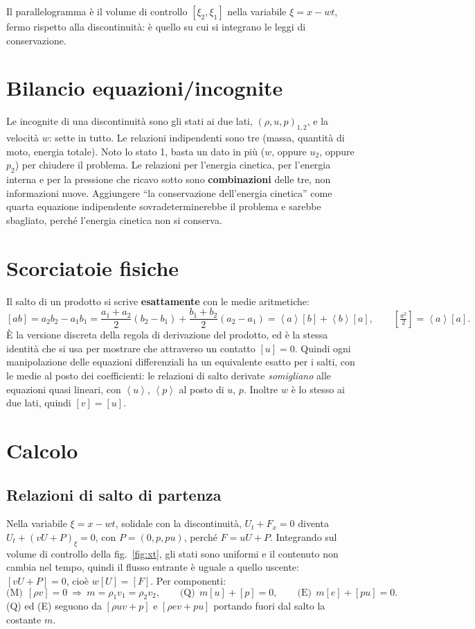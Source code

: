 \documentclass[11pt,a4paper]{article}
\newcommand{\jp}[1]{\left[#1\right]}            %
\newcommand{\av}[1]{\left\langle #1\right\rangle} %
\begin{document}
Il parallelogramma è il volume di controllo $[\xi_2,\xi_1]$ nella variabile $\xi=x-wt$, fermo rispetto alla
discontinuità: è quello su cui si integrano le leggi di conservazione.

\section{Bilancio equazioni/incognite}
Le incognite di una discontinuità sono gli stati ai due lati, $(\rho,u,p)_{1,2}$, e la velocità $w$: sette in
tutto. Le relazioni indipendenti sono tre (massa, quantità di moto, energia totale). Noto lo stato 1, basta un
dato in più ($w$, oppure $u_2$, oppure $p_2$) per chiudere il problema. Le relazioni per l'energia cinetica,
per l'energia interna e per la pressione che ricavo sotto sono \textbf{combinazioni} delle tre, non informazioni
nuove. Aggiungere ``la conservazione dell'energia cinetica'' come quarta equazione indipendente sovradeterminerebbe
il problema e sarebbe sbagliato, perché l'energia cinetica non si conserva.

\section{Scorciatoie fisiche}
Il salto di un prodotto si scrive \textbf{esattamente} con le medie aritmetiche:
\[
  \jp{ab}=a_2b_2-a_1b_1=\frac{a_1+a_2}{2}(b_2-b_1)+\frac{b_1+b_2}{2}(a_2-a_1)
  =\av{a}\jp{b}+\av{b}\jp{a},
  \qquad
  \jp{\tfrac{a^2}{2}}=\av{a}\jp{a}.
\]
È la versione discreta della regola di derivazione del prodotto, ed è la stessa identità che si usa per
mostrare che attraverso un contatto $\jp{u}=0$. Quindi ogni manipolazione delle equazioni differenziali ha un
equivalente esatto per i salti, con le medie al posto dei coefficienti: le relazioni di salto derivate
\emph{somigliano} alle equazioni quasi lineari, con $\av{u}$, $\av{p}$ al posto di $u$, $p$. Inoltre $w$ è lo
stesso ai due lati, quindi $\jp{v}=\jp{u}$.

\section{Calcolo}
\subsection{Relazioni di salto di partenza}
Nella variabile $\xi=x-wt$, solidale con la discontinuità, $U_t+F_x=0$ diventa $U_t+(vU+P)_\xi=0$, con
$P=(0,p,pu)$, perché $F=uU+P$. Integrando sul volume di controllo della fig.~\ref{fig:xt}, gli stati sono
uniformi e il contenuto non cambia nel tempo, quindi il flusso entrante è uguale a quello uscente:
$\jp{vU+P}=0$, cioè $w\jp{U}=\jp{F}$. Per componenti:
\[
  \text{(M)}\ \ \jp{\rho v}=0\ \Rightarrow\ m=\rho_1v_1=\rho_2v_2,\qquad
  \text{(Q)}\ \ m\jp{u}+\jp{p}=0,\qquad
  \text{(E)}\ \ m\jp{e}+\jp{pu}=0 .
\]
(Q) ed (E) seguono da $\jp{\rho uv+p}$ e $\jp{\rho ev+pu}$ portando fuori dal salto la costante $m$.
\end{document}
